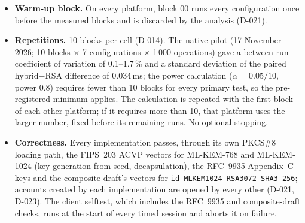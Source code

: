 \documentclass[11pt,a4paper]{article}
\begin{document}
\begin{itemize}
\item \textbf{Warm-up block.} On every platform, block 00 runs every configuration once before the measured blocks and is discarded by the analysis (D-021).
\item \textbf{Repetitions.} 10 blocks per cell (D-014). The native pilot (17 November 2026; 10 blocks $\times$ 7 configurations $\times$ 1\,000 operations) gave a between-run coefficient of variation of 0.1--1.7\,\% and a standard deviation of the paired hybrid$-$RSA difference of 0.034\,ms; the power calculation ($\alpha = 0.05/10$, power 0.8) requires fewer than 10 blocks for every primary test, so the pre-registered minimum applies. The calculation is repeated with the first block of each other platform; if it requires more than 10, that platform uses the larger number, fixed before its remaining runs. No optional stopping.
\item \textbf{Correctness.} Every implementation passes, through its own PKCS\#8 loading path, the FIPS~203 ACVP vectors for ML-KEM-768 and ML-KEM-1024 (key generation from seed, decapsulation), the RFC~9935 Appendix~C keys and the composite draft's vectors for \texttt{id-MLKEM1024-RSA3072-SHA3-256}; accounts created by each implementation are opened by every other (D-021, D-023). The client selftest, which includes the RFC~9935 and composite-draft checks, runs at the start of every timed session and aborts it on failure.
\end{itemize}

\end{document}

